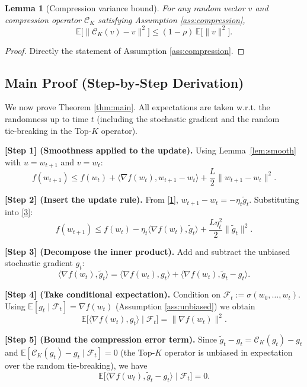 \documentclass[11pt]{article}
\newtheorem{lemma}{Lemma}
\newcommand{\E}{\mathbb{E}}
\begin{document}
\begin{lemma}[Compression variance bound]\label{lem:comp}
For any random vector \(v\) and compression operator \(\mathcal{C}_K\) satisfying
Assumption \ref{ass:compression},
\[
\E\!\big[\|\mathcal{C}_K(v)-v\|^{2}\big]\le (1-\rho)\,\E\!\big[\|v\|^{2}\big].
\]
\end{lemma}
\begin{proof}
Directly the statement of Assumption \ref{ass:compression}.
\end{proof}

\subsection*{Main Proof (Step‑by‑Step Derivation)}
We now prove Theorem \ref{thm:main}.  
All expectations are taken w.r.t. the randomness up to time \(t\)
(including the stochastic gradient and the random tie‑breaking in the Top‑\(K\)
operator).

\bigskip
\noindent\textbf{[Step 1] (Smoothness applied to the update).}
Using Lemma~\ref{lem:smooth} with \(u=w_{t+1}\) and \(v=w_t\):
\[
f(w_{t+1})\le f(w_t)
+\langle\nabla f(w_t),w_{t+1}-w_t\rangle
+\frac{L}{2}\|w_{t+1}-w_t\|^{2}.
\tag{3}
\]

\noindent\textbf{[Step 2] (Insert the update rule).}
From \eqref{1}, \(w_{t+1}-w_t=-\eta_t\tilde g_t\).  Substituting into \eqref{3}:
\[
f(w_{t+1})\le f(w_t)
-\eta_t\langle\nabla f(w_t),\tilde g_t\rangle
+\frac{L\eta_t^{2}}{2}\|\tilde g_t\|^{2}.
\tag{4}
\]

\noindent\textbf{[Step 3] (Decompose the inner product).}
Add and subtract the unbiased stochastic gradient \(g_t\):
\[
\langle\nabla f(w_t),\tilde g_t\rangle
= \langle\nabla f(w_t),g_t\rangle
+ \langle\nabla f(w_t),\tilde g_t-g_t\rangle .
\tag{5}
\]

\noindent\textbf{[Step 4] (Take conditional expectation).}
Condition on \(\mathcal{F}_t:=\sigma(w_0,\dots,w_t)\).  Using
\(\E[g_t\mid\mathcal{F}_t]=\nabla f(w_t)\) (Assumption \ref{ass:unbiased}) we obtain
\[
\E\!\big[\langle\nabla f(w_t),g_t\rangle\mid\mathcal{F}_t\big]
= \|\nabla f(w_t)\|^{2}.
\tag{6}
\]

\noindent\textbf{[Step 5] (Bound the compression error term).}
Since \(\tilde g_t-g_t = \mathcal{C}_K(g_t)-g_t\) and
\(\E[\mathcal{C}_K(g_t)-g_t\mid\mathcal{F}_t]=0\) (the Top‑\(K\) operator is
unbiased in expectation over the random tie‑breaking), we have
\[
\E\!\big[\langle\nabla f(w_t),\tilde g_t-g_t\rangle\mid\mathcal{F}_t\big]=0.
\tag{7}
\]
\end{document}
